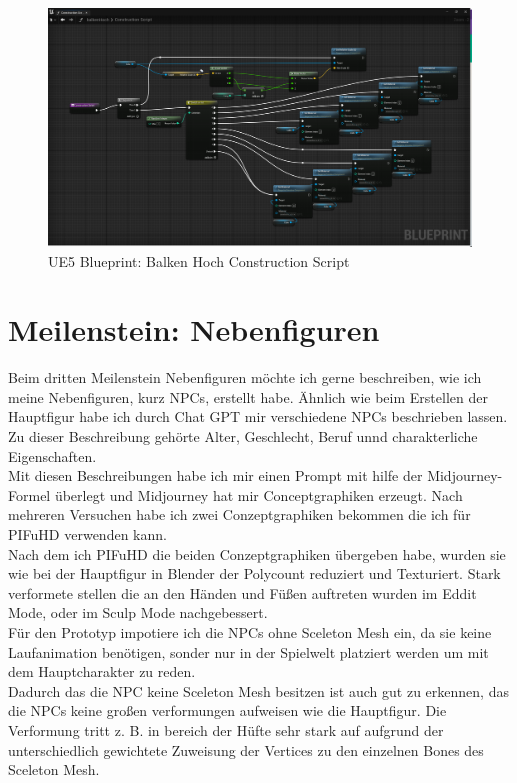 \begin{figure}[h]
	\includegraphics[width=14cm]{BilderFuerBA/Screenshot/UE5/balkenHochBP.png}
	\caption{UE5 Blueprint: Balken Hoch Construction Script}
	\label{UE5balkenHochBP}
\end{figure}

\section {Meilenstein: Nebenfiguren}
Beim dritten Meilenstein Nebenfiguren möchte ich gerne beschreiben, wie ich meine Nebenfiguren, kurz NPCs, erstellt habe. Ähnlich wie beim Erstellen der Hauptfigur habe ich durch Chat GPT mir verschiedene NPCs beschrieben lassen. Zu dieser Beschreibung gehörte Alter, Geschlecht, Beruf unnd charakterliche Eigenschaften.
\\
Mit diesen Beschreibungen habe ich mir einen Prompt mit hilfe der Midjourney-Formel überlegt und Midjourney hat mir Conceptgraphiken erzeugt. Nach mehreren Versuchen habe ich zwei Conzeptgraphiken bekommen die ich für PIFuHD verwenden kann.
\\
Nach dem ich PIFuHD die beiden Conzeptgraphiken übergeben habe, wurden sie wie bei der Hauptfigur in Blender der Polycount reduziert und Texturiert.  Stark verformete stellen die an den Händen und Füßen auftreten wurden im Eddit Mode, oder im Sculp Mode nachgebessert.
\\
Für den Prototyp impotiere ich die NPCs ohne Sceleton Mesh ein, da sie keine Laufanimation benötigen, sonder nur in der Spielwelt platziert werden um mit dem Hauptcharakter zu reden.
\\
Dadurch das die NPC keine Sceleton Mesh besitzen ist auch gut zu erkennen, das die NPCs keine großen verformungen aufweisen wie die Hauptfigur. Die Verformung tritt z. B. in bereich der Hüfte sehr stark auf aufgrund der unterschiedlich gewichtete Zuweisung der Vertices zu den einzelnen Bones des Sceleton Mesh.


